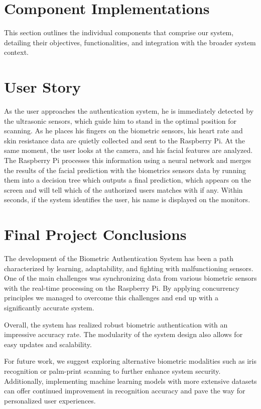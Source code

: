\documentclass{article}
\begin{document}
\section{Component Implementations}\label{sec:component-implementations} This section outlines the individual
components that comprise our system, detailing their objectives, functionalities,
and integration with the broader system context.

\newpage

\newpage

\newpage

\newpage

\newpage

\newpage

\section{User Story} As the user approaches the authentication system, he is
immediately detected by the ultrasonic sensors, which guide him to stand in the
optimal position for scanning. As he places his fingers on the biometric sensors,
his heart rate and skin resistance data are quietly collected and sent to the
Raspberry Pi. At the same moment, the user looks at the camera, and his facial
features are analyzed. The Raspberry Pi processes this information using
a neural network and merges the results of the facial prediction with the biometrics sensors
data by running them into a decision tree which outputs a final prediction, which appears on the screen
and will tell which of the authorized users matches with if any. Within seconds, if the system identifies the user, 
his name is displayed on the monitors.

\section{Final Project Conclusions} The development of the Biometric
Authentication System has been a path characterized by learning, adaptability,
and fighting with malfunctioning sensors. One of the main challenges was synchronizing data from various
biometric sensors with the real-time processing on the Raspberry Pi.
By applying concurrency principles we managed to overcome this challenges and end up with a significantly accurate system.

Overall, the system has realized robust biometric authentication with an
impressive accuracy rate. The modularity of the system design also allows for
easy updates and scalability.

For future work, we suggest exploring alternative biometric modalities such as
iris recognition or palm-print scanning to further enhance system security.
Additionally, implementing machine learning models with more extensive datasets
can offer continued improvement in recognition accuracy and pave the way for
personalized user experiences.
\end{document}
